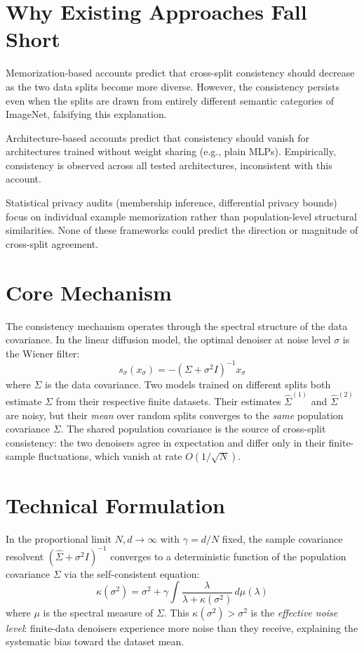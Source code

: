 \documentclass[10pt,twocolumn]{article}
\begin{document}
\section{Why Existing Approaches Fall Short}

Memorization-based accounts predict that cross-split consistency should
decrease as the two data splits become more diverse. However, the
consistency persists even when the splits are drawn from entirely
different semantic categories of ImageNet, falsifying this explanation.

Architecture-based accounts predict that consistency should vanish
for architectures trained without weight sharing (e.g., plain MLPs).
Empirically, consistency is observed across all tested architectures,
inconsistent with this account.

Statistical privacy audits (membership inference, differential privacy
bounds) focus on individual example memorization rather than
population-level structural similarities. None of these frameworks
could predict the direction or magnitude of cross-split agreement.

\section{Core Mechanism}

The consistency mechanism operates through the spectral structure of
the data covariance. In the linear diffusion model, the optimal denoiser
at noise level $\sigma$ is the Wiener filter:
\[
s_\sigma(x_\sigma) = -(\Sigma + \sigma^2 I)^{-1} x_\sigma
\]
where $\Sigma$ is the data covariance. Two models trained on different
splits both estimate $\Sigma$ from their respective finite datasets.
Their estimates $\hat{\Sigma}^{(1)}$ and $\hat{\Sigma}^{(2)}$ are noisy,
but their \emph{mean} over random splits converges to the \emph{same}
population covariance $\Sigma$. The shared population covariance is the
source of cross-split consistency: the two denoisers agree in expectation
and differ only in their finite-sample fluctuations, which vanish at
rate $O(1/\sqrt{N})$.

\section{Technical Formulation}

In the proportional limit $N, d \to \infty$ with $\gamma = d/N$ fixed,
the sample covariance resolvent $(\hat{\Sigma} + \sigma^2 I)^{-1}$ converges
to a deterministic function of the population covariance $\Sigma$ via
the self-consistent equation:
\[
\kappa(\sigma^2) = \sigma^2 + \gamma \int \frac{\lambda}{\lambda + \kappa(\sigma^2)}\,d\mu(\lambda)
\]
where $\mu$ is the spectral measure of $\Sigma$. This $\kappa(\sigma^2) > \sigma^2$
is the \emph{effective noise level}: finite-data denoisers experience more
noise than they receive, explaining the systematic bias toward the dataset
mean.
\end{document}
